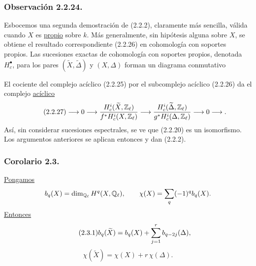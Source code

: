 \subsubsection*{Observación 2.2.24.}
Esbocemos una segunda demostración de (2.2.2), claramente más sencilla,
válida cuando $X$ es \underline{propio} sobre $k$. Más generalmente,
sin hipótesis alguna sobre $X$, se obtiene el resultado correspondiente
(2.2.26) en cohomología con soportes propios. Las sucesiones exactas de
cohomología con soportes propios, denotada $H_c^\bullet$, para los pares
$(\widetilde X,\widetilde\Delta)$ y $(X,\Delta)$ forman un diagrama
conmutativo

\pageoriginale

\begin{center}
\end{center}
El cociente del complejo acíclico (2.2.25) por el subcomplejo acíclico
(2.2.26) da el complejo \underline{acíclico}
\begin{equation}\tag{2.2.27}
\longrightarrow0\longrightarrow
\frac{H_c^i(\widetilde X,\mathbb Z_\ell)}
     {f^*H_c^i(X,\mathbb Z_\ell)}
\longrightarrow
\frac{H_{\sisi{C}{c}}^i(\widetilde\Delta,\mathbb Z_\ell)}
     {g^*H_c^i(\Delta,\mathbb Z_\ell)}
\longrightarrow0\longrightarrow.
\end{equation}
Así, sin considerar sucesiones espectrales, se ve que (2.2.20) es un
isomorfismo. Los argumentos anteriores se aplican entonces y dan (2.2.2).

\subsubsection*{Corolario 2.3.}
\underline{Pongamos}
\[
b_q(X)=\dim_{\mathbb Q_\ell}H^q(\sisi{\chi}{X},\mathbb Q_\ell),
\qquad
\chi(X)=\sum_q(-1)^qb_q(X).
\]
\underline{Entonces}
\begin{equation}\tag{2.3.1}
b_q(\widetilde X)
=b_q(X)+\sum_{j=1}^{r}b_{\sisi{q-j}{q-2j}}(\Delta),
\end{equation}
\begin{equation}\tag{2.3.2}
\chi(\widetilde X)=\chi(X)+r\,\chi(\Delta).
\end{equation}

